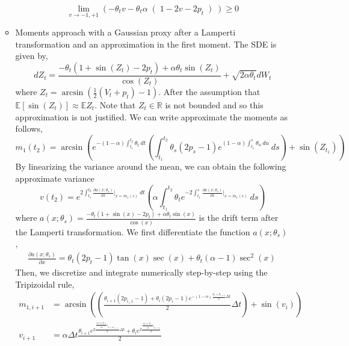 \documentclass[a4paper, 12pt]{article}
\newcommand{\R}{\mathbb{R}}
\newcommand{\E}{\mathbb{E}}
\begin{document}
\begin{itemize}
\begin{itemize}
	\begin{equation*}
		\lim_{v\to -1,+1} \left( - \theta_t v - \theta_t \alpha \right( 1- 2v - 2p_t \left) \right) \geq 0
\end{equation*}
		\item Moments approach with a Gaussian proxy after a Lamperti transformation and an approximation in the first moment. The SDE is given by,
		\begin{equation}
			dZ_t= \frac{- \theta_t (1+ \sin(Z_t) - 2p_t) + \alpha \theta_t \sin (Z_t)   }{\cos (Z_t)} + \sqrt{2 \alpha \theta_t} dW_t
	\end{equation}
		where $Z_t = \arcsin \left( \frac{1}{2} \left( V_t+p_t \right) - 1 \right) $. After the assumption that $\E[\sin(Z_t)]
	 \approx \E Z_t$. Note that $Z_t \in \R $ is not bounded and so this approximation is not justified. We can write approximate the moments as follows,
		\begin{equation*}
					m_1(t_2)= \arcsin \left( e^{- (1-\alpha) \int_{t_1}^{t_2} \theta_t \ dt }  \left(  \int_{t_1}^{t_2} \theta_s \left( 2p_s-1\right)e^{(1-\alpha) \int_{t_1}^{s} \theta_u \ du } \ ds \right) + \sin (Z_{t_1}) \right)
		\end{equation*}
		By linearizing the variance around the mean, we can obtain the following approximate variance
		\begin{equation}
					v(t_2)= e^{2\int_{t_1}^{t_2} \frac{\partial a(x;\theta_s)}{\partial x}|_{x=m_1(s)} \ dt} \left(\alpha \int_{t_1}^{t_2} \theta_t e^{-2\int_{t_1}^{s} \frac{\partial a(x;\theta_s)}{\partial x}|_{x=m_1(s)} } \ ds  \right)
		\end{equation}
		where $a(x;\theta_s)=\frac{- \theta_t (1+ \sin(x) - 2p_t) + \alpha \theta_t \sin (x)   }{\cos (x)}$ is the drift term after the Lamperti transformation.
		We first differentiate the function $a(x;\theta_s)$,
		\begin{align*}
			\frac{\partial a(x;\theta_s)}{\partial x} = \theta_t (2p_t - 1) \tan (x) \sec (x) + \theta_t (\alpha - 1)\sec^2 (x) \
		\end{align*}
		Then, we discretize and integrate numerically step-by-step using the Tripizoidal rule,
		\begin{align*}
			m_{1,i+1} &= \arcsin \left(  \left(  \frac{ \theta_{i+1}(2p_{i_+1} - 1) + \theta_{i}(2p_{i} - 1)e^{- (1-\alpha) \frac{\theta_i + \theta_{i+1}}{2} \Delta t}   }{2} \Delta t \right)  +  \sin(v_i) \right) \\
			v_{i+1} &= \alpha \Delta t  \frac{ \theta_{i+1} e^{2 \frac{\frac{\partial a(x;\theta_s)}{\partial x}|_{x=m_{1,i+1}}}{2} \Delta t  }+  \theta_{i}  e^{2 \frac{\frac{\partial a(x;\theta_s)}{\partial x}|_{x= v_i}}{2}   } }{2}
	\end{align*}


\end{itemize}
\end{itemize}
\end{document}
